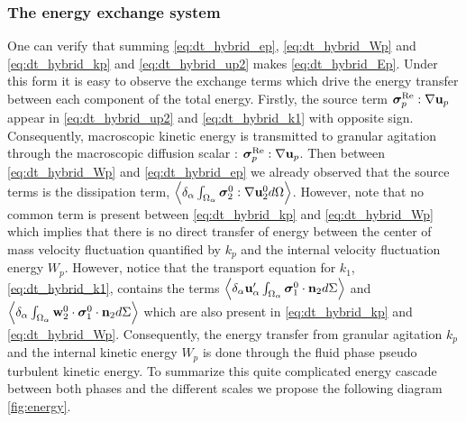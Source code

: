 \subsubsection*{The energy exchange system}

One can verify that summing \ref{eq:dt_hybrid_ep}, \ref{eq:dt_hybrid_Wp} and \ref{eq:dt_hybrid_kp} and \ref{eq:dt_hybrid_up2} makes \ref{eq:dt_hybrid_Ep}.  
Under this form it is easy to observe the exchange terms which drive the energy transfer between each component of the total energy. 
Firstly, the source term $\bm{\sigma}_p^\text{Re} :\mathbf{\nabla} \textbf{u}_p$ appear in \ref{eq:dt_hybrid_up2} and \ref{eq:dt_hybrid_k1} with opposite sign. 
Consequently, macroscopic kinetic energy is transmitted to granular agitation through the macroscopic diffusion scalar : $\bm{\sigma}_p^\text{Re} :\mathbf{\nabla} \textbf{u}_p$. 
Then between \ref{eq:dt_hybrid_Wp} and \ref{eq:dt_hybrid_ep} we already observed that the source terms is the dissipation term,  $\left<\delta_\alpha \int_{\Omega_\alpha} \bm{\sigma}_2^0:\mathbf{\nabla} \textbf{u}_2^0 d\Omega\right>$.
However, note that no common term is present between \ref{eq:dt_hybrid_kp} and \ref{eq:dt_hybrid_Wp} which implies that there is no direct transfer of energy between the center of mass velocity fluctuation quantified by $k_p$ and the internal velocity fluctuation energy $W_p$. 
However, notice that the transport equation for $k_1$, \ref{eq:dt_hybrid_k1}, contains the terms $\left<\delta_\alpha \textbf{u}_\alpha' \int_{\Omega_\alpha} \bm{\sigma}_1^0 \cdot \textbf{n}_2 d\Sigma\right>$ and $\left<\delta_\alpha \int_{\Omega_\alpha} \textbf{w}_2^0 \cdot \bm{\sigma}_1^0 \cdot \textbf{n}_2 d\Sigma\right>$ which are also present in \ref{eq:dt_hybrid_kp} and \ref{eq:dt_hybrid_Wp}. 
Consequently, the energy transfer from granular agitation $k_p$ and the internal kinetic energy $W_p$ is done through the fluid phase pseudo turbulent kinetic energy. 
To summarize this quite complicated energy cascade between both phases and the different scales we propose the following diagram \ref{fig:energy}. 
